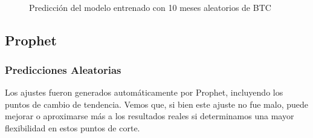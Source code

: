 \documentclass[a4paper,10pt]{article}
\begin{document}
\begin{figure}[H]
    \\
  \caption{Predicción del modelo entrenado con 10 meses aleatorios de BTC}
  \label{f:btc_mth_arima}
\end{figure}







\subsection{Prophet}

\subsubsection{Predicciones Aleatorias}

Los ajustes fueron generados automáticamente por Prophet, incluyendo los puntos de cambio de tendencia. Vemos que, si bien este ajuste no fue malo, puede mejorar o aproximarse más a los resultados reales si determinamos una mayor flexibilidad en estos puntos de corte.
\end{document}
